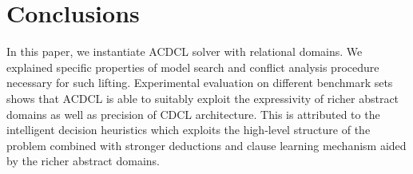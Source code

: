 \section{Conclusions}
In this paper, we instantiate ACDCL solver with relational domains.  We explained specific properties of model search and conflict analysis procedure necessary
for such lifting.  Experimental evaluation on different benchmark sets shows that
ACDCL is able to suitably exploit the expressivity of richer
abstract domains as well as precision of CDCL architecture.
This is attributed to the intelligent decision heuristics
which exploits the high-level structure of the problem
combined with stronger deductions and clause learning
mechanism aided by the richer abstract domains.

